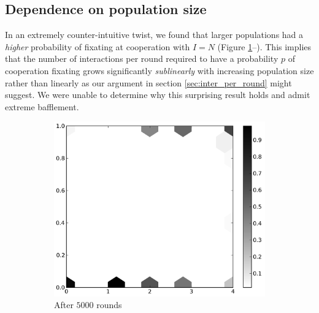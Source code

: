 \documentclass{amsart}
\begin{document}
\subsection{Dependence on population size}

In an extremely counter-intuitive twist, we found that larger
populations had a \emph{higher} probability of fixating at cooperation
with $I=N$ (Figure \ref{fig:varyN5000}--). This
implies that the number of interactions per round required to have a
probability $p$ of cooperation fixating grows significantly
\emph{sublinearly} with increasing population size rather than
linearly as our argument in section \ref{sec:inter_per_round} might
suggest. We were unable to determine why this surprising result holds
and admit extreme bafflement.

\begin{figure}[h!tbp]
  \begin{subfigure}{.485\linewidth}
    \centering
    \includegraphics[width=\linewidth]{varyN5000.png}
    \caption{After $5000$ rounds}
    \label{fig:varyN5000}
  \end{subfigure}
  \hspace{.01\linewidth}
  \begin{subfigure}{.485\linewidth}
    \centering

\end{subfigure}
\end{figure}
\end{document}
